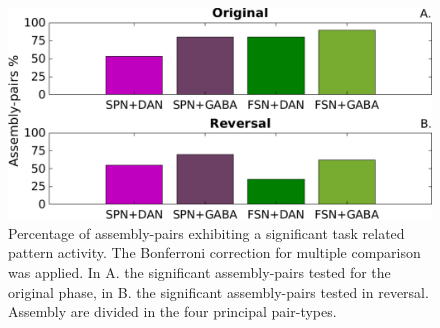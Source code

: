 \begin{figure}[H]
\centering
\includegraphics[scale=0.5]{figures/PercFriedHitTrialsBFf.pdf}
\caption{Percentage of assembly-pairs exhibiting a significant task related pattern activity. The Bonferroni correction for multiple comparison was applied. In A. the significant assembly-pairs tested for the original phase, in B. the significant assembly-pairs tested in reversal. Assembly are divided in the four principal pair-types.}
\label{fig:PercAsFried}
\end{figure}
